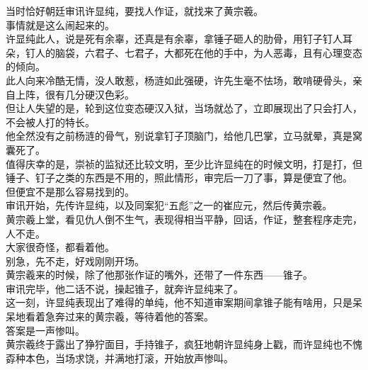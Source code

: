 \begin{multicols}{\theparacolNo}
当时恰好朝廷审讯许显纯，要找人作证，就找来了黄宗羲。\\

事情就是这么闹起来的。\\

许显纯此人，说是死有余辜，还真是有余辜，拿锤子砸人的肋骨，用钉子钉人耳朵，钉人的脑袋，六君子、七君子，大都死在他的手中，为人恶毒，且有心理变态的倾向。\\

此人向来冷酷无情，没人敢惹，杨涟如此强硬，许先生毫不怯场，敢啃硬骨头，亲自上阵，很有几分硬汉色彩。\\

但让人失望的是，轮到这位变态硬汉入狱，当场就怂了，立即展现出了只会打人，不会被人打的特长。\\

他全然没有之前杨涟的骨气，别说拿钉子顶脑门，给他几巴掌，立马就晕，真是窝囊死了。\\

值得庆幸的是，崇祯的监狱还比较文明，至少比许显纯在的时候文明，打是打，但锤子、钉子之类的东西是不用的，照此情形，审完后一刀了事，算是便宜了他。\\

但便宜不是那么容易找到的。\\

审讯开始，先传许显纯，以及同案犯“五彪”之一的崔应元，然后传黄宗羲。\\

黄宗羲上堂，看见仇人倒不生气，表现得相当平静，回话，作证，整套程序走完，人不走。\\

大家很奇怪，都看着他。\\

别急，先不走，好戏刚刚开场。\\

黄宗羲来的时候，除了他那张作证的嘴外，还带了一件东西——锥子。\\

审讯完毕，他二话不说，操起锥子，就奔许显纯来了。\\

这一刻，许显纯表现出了难得的单纯，他不知道审案期间拿锥子能有啥用，只是呆呆地看着急奔过来的黄宗羲，等待着他的答案。\\

答案是一声惨叫。\\

黄宗羲终于露出了狰狞面目，手持锥子，疯狂地朝许显纯身上戳，而许显纯也不愧孬种本色，当场求饶，并满地打滚，开始放声惨叫。\\


\end{multicols}
